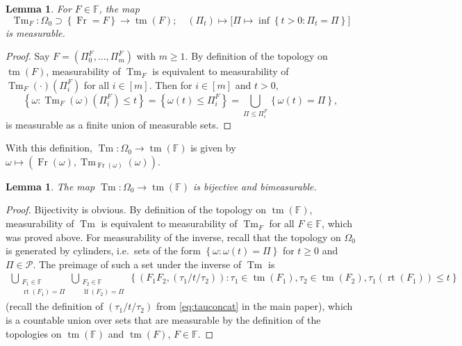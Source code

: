 \documentclass[reqno,draft]{amsart}
\numberwithin{equation}{section}
\theoremstyle{plain}
\newtheorem{lemma}[theorem]{Lemma}
\theoremstyle{remark}
\newcommand{\fpart}{\Pi} %
\DeclareMathOperator{\lf}{lf}
\DeclareMathOperator{\rt}{rt}
\DeclareMathOperator{\dct}{tm}
\DeclareMathOperator{\fr}{Fr}
\DeclareMathOperator{\tm}{Tm}
\begin{document}
\begin{lemma}\label{lem:tmFmeasurable}
    For $F \in \mathbb{F}$, the map \[
        \tm_F\colon \Omega_0 \supset\left\{ \fr = F \right\} \to \dct(F);\quad (\fpart_t) \mapsto \big[ \fpart \mapsto  \inf \left\{ t > 0\colon \fpart_t = \fpart \right\}  \big]
    \] is measurable.
\end{lemma}
\begin{proof}
    Say $F = (\fpart_0^F, \ldots ,\fpart_m^F)$ with $m \ge 1$. By definition of the topology on $\dct(F)$, measurability of $\tm_F$ is equivalent to measurability of $\tm_F(\cdot )(\fpart^F_i)$ for all $i\in [m]$. Then for $i \in [m]$ and $t > 0$, \[
        \left\{ \omega\colon \tm_F(\omega)(\fpart^F_i) \le t \right\} = \left\{ \omega(t) \le \fpart^F_i \right\} = \bigcup_{\fpart \le \fpart^F_i} \left\{ \omega(t) = \fpart \right\} ,
    \] is measurable as a finite union of measurable sets.
\end{proof}

With this definition, $\tm\colon \Omega_0 \to \dct(\mathbb{F})$ is given by $\omega \mapsto (\fr(\omega), \tm_{\fr(\omega)}(\omega))$.

\begin{lemma}\label{lem:tmmeasurable}
    The map $\tm\colon \Omega_0 \to \dct(\mathbb{F})$ is bijective and bimeasurable.
\end{lemma}
\begin{proof}
    Bijectivity is obvious. By definition of the topology on $\dct(\mathbb{F})$, measurability of $\tm$ is equivalent to measurability of $\tm_F$ for all $F \in \mathbb{F}$, which was proved above. For measurability of the inverse, recall that the topology on $\Omega_0$ is generated by cylinders, i.e.\ sets of the form $\left\{ \omega\colon \omega(t) = \fpart \right\} $ for $t \ge 0$ and $\fpart \in \mathcal{P}$. The preimage of such a set under the inverse of $\tm$ is
    \begin{align*}
        \bigcup_{\substack{F_1\in \mathbb{F} \\ \rt(F_1) = \fpart} } \bigcup_{\substack{F_2\in \mathbb{F} \\ \lf(F_2) = \fpart} } \left\{ (F_1F_2,(\tau_1 / t / \tau_2)) \colon \tau_1 \in \dct(F_1), \tau_2\in \dct(F_2), \tau_1(\rt(F_1)) \le t \right\}
    \end{align*}
    (recall the definition of $(\tau_1 / t / \tau_2)$ from \eqref{eq:tauconcat} in the main paper), %
    which is a countable union over sets that are measurable by the definition of the topologies on $\dct(\mathbb{F})$ and $\dct(F),\, F \in \mathbb{F}$.
\end{proof}
\end{document}
